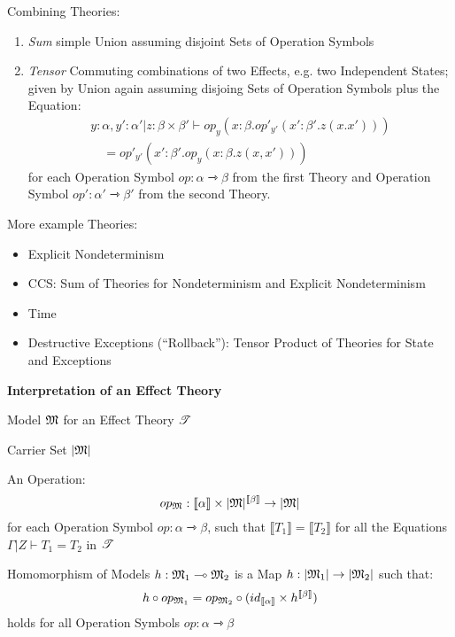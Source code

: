 Combining Theories:
\begin{enumerate}
  \item \emph{Sum} simple Union assuming disjoint Sets of Operation
    Symbols

  \item \emph{Tensor} Commuting combinations of two Effects, e.g. two
    Independent States; given by Union again assuming disjoing Sets of
    Operation Symbols plus the Equation:
    \[
    \begin{split}
      y:\alpha,y':\alpha' | z:\beta \times \beta' \vdash
        op_y(x:\beta.op'_{y'}(x':\beta'.z(x.x'))) \\
        \quad = op'_{y'}(x':\beta'.op_y(x:\beta.z(x,x')))
    \end{split}
    \]
    for each Operation Symbol $op : \alpha \rightarrowtriangle \beta$
    from the first Theory and Operation Symbol $op' : \alpha'
    \rightarrowtriangle \beta'$ from the second Theory.
\end{enumerate}

More example Theories:
\begin{itemize}
  \item Explicit Nondeterminism
  \item CCS: Sum of Theories for Nondeterminism and Explicit
    Nondeterminism
  \item Time
  \item Destructive Exceptions (``Rollback''): Tensor Product of
    Theories for State and Exceptions
\end{itemize}


\textbf{Interpretation of an Effect Theory}

Model $\mathfrak{M}$ for an Effect Theory $\mathscr{T}$

Carrier Set $|\mathfrak{M}|$

An Operation:
\[
  op_\mathfrak{M} : \llbracket \alpha \rrbracket \times
    |\mathfrak{M}|^{\llbracket \beta \rrbracket} \rightarrow |\mathfrak{M}|
\]
for each Operation Symbol $op:\alpha \rightarrowtriangle \beta$, such
that $\llbracket T_1 \rrbracket = \llbracket T_2 \rrbracket$ for all
the Equations $\Gamma | Z \vdash T_1 = T_2$ in $\mathscr{T}$

Homomorphism of Models $h : \mathfrak{M}_1 \multimap \mathfrak{M}_2$ is a
Map $h : |\mathfrak{M}_1| \rightarrow |\mathfrak{M}_2|$ such that:
\[
  h \circ op_{\mathfrak{M}_1} = op_{\mathfrak{M}_2} \circ
    (id_{\llbracket \alpha \rrbracket}
      \times h^{\llbracket \beta \rrbracket})
\]
holds for all Operation Symbols $op:\alpha \rightarrowtriangle \beta$

